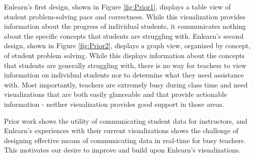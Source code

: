\documentclass{sigchi}
\begin{document}
Enlearn's first design, shown in Figure \ref{fig:Prior1}, displays a table view of student problem-solving pace and correctness. While this visualization provides information about the progress of individual students, it communicates nothing about the specific concepts that students are struggling with. Enlearn's second design, shown in Figure \ref{fig:Prior2}, displays a graph view, organized by concept, of student problem solving. While this displays information about the concepts that students are generally struggling with, there is no way for teachers to view information on individual students nor to determine what they need assistance with. Most importantly, teachers are extremely busy during class time and need visualizations that are both easily glanceable and that provide actionable information - neither visualization provides good support in those areas.

Prior work shows the utility of communicating student data for instructors, and Enlearn's experiences with their current visualizations shows the challenge of designing effective means of communicating data in real-time for busy teachers. This motivates our desire to improve and build upon Enlearn's visualizations.

\end{document}

